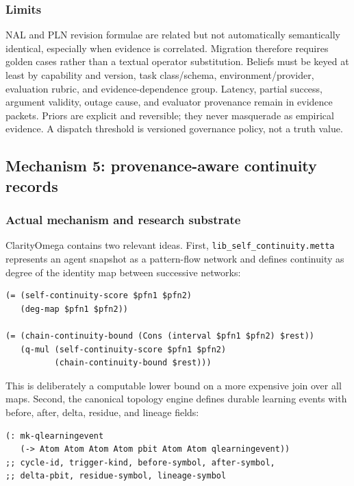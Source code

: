 \documentclass[11pt]{article}
\begin{document}
\subsubsection{Limits}

NAL and PLN revision formulae are related but not automatically semantically
identical, especially when evidence is correlated.  Migration therefore requires
golden cases rather than a textual operator substitution.  Beliefs must be keyed
at least by capability and version, task class/schema, environment/provider,
evaluation rubric, and evidence-dependence group.  Latency, partial success,
argument validity, outage cause, and evaluator provenance remain in evidence
packets.  Priors are explicit and reversible; they never masquerade as empirical
evidence.  A dispatch threshold is versioned governance policy, not a truth value.

\subsection{Mechanism 5: provenance-aware continuity records}

\subsubsection{Actual mechanism and research substrate}

ClarityOmega contains two relevant ideas.  First,
\texttt{lib\_self\_continuity.metta} represents an agent snapshot as a
pattern-flow network and defines continuity as degree of the identity map between
successive networks:

\begin{lstlisting}
(= (self-continuity-score $pfn1 $pfn2)
   (deg-map $pfn1 $pfn2))

(= (chain-continuity-bound (Cons (interval $pfn1 $pfn2) $rest))
   (q-mul (self-continuity-score $pfn1 $pfn2)
          (chain-continuity-bound $rest)))
\end{lstlisting}

This is deliberately a computable lower bound on a more expensive join over all
maps.  Second, the canonical topology engine defines durable learning events with
before, after, delta, residue, and lineage fields:

\begin{lstlisting}
(: mk-qlearningevent
   (-> Atom Atom Atom Atom pbit Atom Atom qlearningevent))
;; cycle-id, trigger-kind, before-symbol, after-symbol,
;; delta-pbit, residue-symbol, lineage-symbol
\end{lstlisting}
\end{document}
